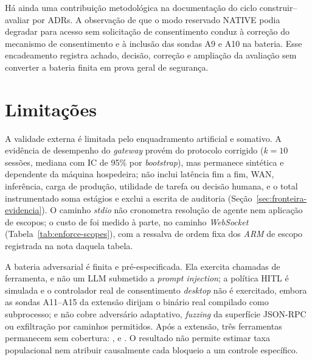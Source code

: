 \documentclass[12pt,openright,twoside,a4paper,english,brazil]{abntex2}
\begin{document}
Há ainda uma contribuição metodológica na documentação do ciclo construir--avaliar por ADRs. A observação de que o modo reservado NATIVE podia degradar para acesso sem solicitação de consentimento conduz à correção do mecanismo de consentimento e à inclusão das sondas A9 e A10 na bateria. Esse encadeamento registra achado, decisão, correção e ampliação da avaliação sem converter a bateria finita em prova geral de segurança.

\section{Limitações}
A validade externa é limitada pelo enquadramento artificial e somativo. A evidência de desempenho do \textit{gateway} provém do protocolo corrigido ($k=10$ sessões, mediana com IC de 95\% por \textit{bootstrap}), mas permanece sintética e dependente da máquina hospedeira; não inclui latência fim a fim, WAN, inferência, carga de produção, utilidade de tarefa ou decisão humana, e o total instrumentado soma estágios e exclui a escrita de auditoria (Seção~\ref{sec:fronteira-evidencia}). O caminho \textit{stdio} não cronometra resolução de agente nem aplicação de escopos; o custo de  foi medido à parte, no caminho \textit{WebSocket} (Tabela~\ref{tab:enforce-scopes}), com a ressalva de ordem fixa dos \textit{ARM} de escopo registrada na nota daquela tabela.

A bateria adversarial é finita e pré-especificada. Ela exercita chamadas de ferramenta, e não um LLM submetido a \textit{prompt injection}; a política HITL é simulada e o controlador real de consentimento \textit{desktop} não é exercitado, embora as sondas A11--A15 da extensão dirijam o binário real compilado como subprocesso; e não cobre adversário adaptativo, \textit{fuzzing} da superfície JSON-RPC ou exfiltração por caminhos permitidos. Após a extensão, três ferramentas permanecem sem cobertura: ,  e . O resultado não permite estimar taxa populacional nem atribuir causalmente cada bloqueio a um controle específico.
\end{document}
